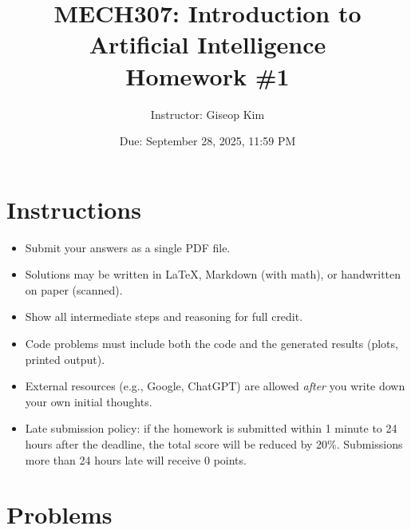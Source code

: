 \documentclass[12pt]{article}
\title{MECH307: Introduction to Artificial Intelligence \\ Homework \#1}
\author{Instructor: Giseop Kim}
\date{Due: September 28, 2025, 11:59 PM}
\begin{document}
\maketitle

\section*{Instructions}
\begin{itemize}
    \item Submit your answers as a single PDF file.
    \item Solutions may be written in \LaTeX, Markdown (with math), or handwritten on paper (scanned).
    \item Show all intermediate steps and reasoning for full credit.
    \item Code problems must include both the code and the generated results (plots, printed output).
    \item External resources (e.g., Google, ChatGPT) are allowed \emph{after} you write down your own initial thoughts.
    \item Late submission policy: if the homework is submitted within 1 minute to 24 hours after the deadline, the total score will be reduced by 20\%. 
    Submissions more than 24 hours late will receive 0 points.
\end{itemize}

\section*{Problems}
\end{document}
